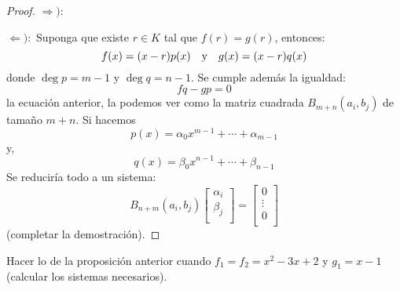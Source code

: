 \documentclass[12pt]{report}
\theoremstyle{largebreak}
\begin{document}
    \begin{proof}
        $\Rightarrow):$

        $\Leftarrow):$ Suponga que existe $r\in K$ tal que $f(r)=g(r)$, entonces:
        \begin{equation*}
            f(x)=(x-r)p(x)\quad\textup{y}\quad g(x)=(x-r)q(x)
        \end{equation*}
        donde $\deg p=m-1$ y $\deg q=n-1$. Se cumple además la igualdad:
        \begin{equation*}
            fq-gp=0
        \end{equation*}
        la ecuación anterior, la podemos ver como la matriz cuadrada $B_{m+n}(a_i,b_j)$ de tamaño $m+n$. Si hacemos
        \begin{equation*}
            p(x)=\alpha_0x^{ m-1}+\cdots+\alpha_{ m-1}
        \end{equation*}
        y,
        \begin{equation*}
            q(x)=\beta_0x^{ n-1}+\cdots+\beta_{ n-1}
        \end{equation*}
        Se reduciría todo a un sistema:
        \begin{equation*}
            B_{ n+m}(a_i,b_j)\left[ 
                \begin{array}{c}
                    \alpha_i \\
                    \beta_j \\
                \end{array}
            \right]=\left[ 
                \begin{array}{c}
                    0 \\
                    \vdots \\
                    0 \\
                \end{array}
            \right]
        \end{equation*}
        (completar la demostración).
    \end{proof}

    \begin{excer}
        Hacer lo de la proposición anterior cuando $f_1=f_2=x^2-3x+2$ y $g_1=x-1$ (calcular los sistemas necesarios).
    \end{excer}

    \begin{sol}
        
    \end{sol}
\end{document}
